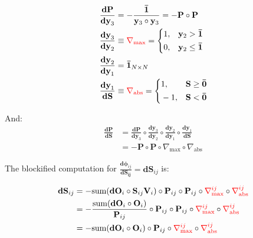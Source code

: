 \begin{align*}
    \frac{\mathbf{dP}}{\mathbf{dy}_3} & = -\frac{\mathbf{\bar{1}}}{\mathbf{y}_3 \circ \mathbf{y}_3}= -\mathbf{P}\circ \mathbf{P}\\
    \frac{\mathbf{dy}_3}{\mathbf{dy}_2} &\equiv \textcolor{red}{\nabla_{\max}}= \left\{
        \begin{aligned}
            &1, &\mathbf{y}_2 > \mathbf{\bar{1}}\\
            &0, &\mathbf{y}_2 \le \mathbf{\bar{1}}
        \end{aligned}
    \right. \\
    \frac{\mathbf{dy}_2}{\mathbf{dy}_1} &= \mathbf{\bar{1}}_{N\times N} \\
    \frac{\mathbf{dy}_1}{\mathbf{dS}} &\equiv \textcolor{red}{\nabla_{\text{abs}}}= \left\{
        \begin{aligned}
            &1, & \mathbf{S} \ge \mathbf{\bar{0}}\\
            &-1, & \mathbf{S} < \mathbf{\bar{0}}
        \end{aligned}
    \right.
\end{align*}

And:
\begin{align*}
    \frac{\mathbf{dP}}{\mathbf{dS}} &=\frac{\mathbf{dP}}{\mathbf{dy}_3}\circ \frac{\mathbf{dy}_3}{\mathbf{dy}_2} \circ \frac{\mathbf{dy}_2}{\mathbf{dy}_1} \circ \frac{\mathbf{dy}_1}{\mathbf{dS}} \\
    &= -\mathbf{P}\circ\mathbf{P} \circ \nabla_{\max} \circ \nabla_{\text{abs}}
\end{align*}

The blockified computation for $\frac{\mathbf{d\phi}_{ij}}{\mathbf{dS_{ij}}}=\mathbf{dS}_{ij}$ is:

\begin{align*}
\mathbf{dS}_{ij} &= - \text{sum}(\mathbf{dO}_i\circ \mathbf{S}_{ij}\mathbf{V}_i) \circ \mathbf{P}_{ij}\circ{\mathbf{P}_{ij}} \circ \textcolor{red}{\nabla_{\max}^{ij}} \circ \textcolor{red}{\nabla_{\text{abs}}^{ij}}\\
&=-\frac{\text{sum}(\mathbf{dO}_i\circ\mathbf{O}_i)}{\mathbf{P}_{ij}}\circ \mathbf{P}_{ij}\circ{\mathbf{P}_{ij}} \circ \textcolor{red}{\nabla_{\max}^{ij}} \circ \textcolor{red}{\nabla_{\text{abs}}^{ij}} \\
&=-\text{sum}(\mathbf{dO}_i\circ\mathbf{O}_i)\circ{\mathbf{P}_{ij}} \circ \textcolor{red}{\nabla_{\max}^{ij}} \circ \textcolor{red}{\nabla_{\text{abs}}^{ij}}
\end{align*}

